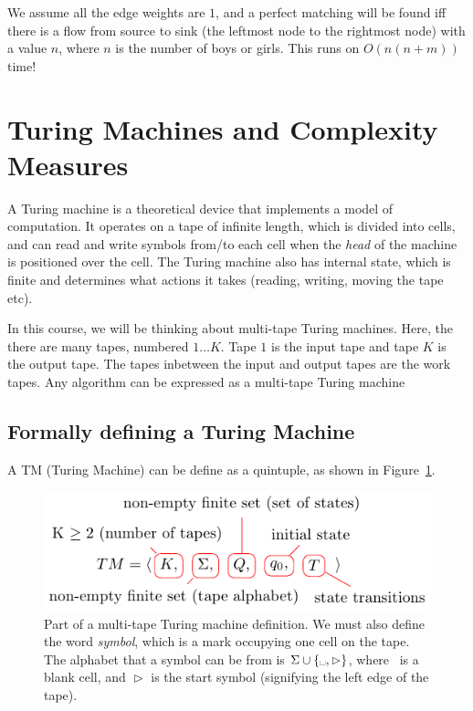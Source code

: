 We assume all the edge weights are $1$, and a perfect matching will be found iff
there is a flow from source to sink (the leftmost node to the rightmost node)
with a value $n$, where $n$ is the number of boys or girls. This runs on
$O(n(n+m))$ time!

\section{Turing Machines and Complexity Measures}

A Turing machine is a theoretical device that implements a model of computation.
It operates on a tape of infinite length, which is divided into cells, and can
read and write symbols from/to each cell when the \textit{head} of the machine
is positioned over the cell. The Turing machine also has internal state, which
is finite and determines what actions it takes (reading, writing, moving the
tape etc).

In this course, we will be thinking about multi-tape Turing machines. Here, the
there are many tapes, numbered $1 \dots K$. Tape $1$ is the input tape and tape
$K$ is the output tape. The tapes inbetween the input and output tapes are the
work tapes. Any algorithm can be expressed as a multi-tape Turing machine

\subsection{Formally defining a Turing Machine}

A TM (Turing Machine) can be define as a quintuple, as shown in
Figure~\ref{fig:tm-definition}.

\begin{figure}[H]
  \centering
  \includegraphics{equations/tm-definition}
  \caption{Part of a multi-tape Turing machine definition. We must also define
  the word \textit{symbol}, which is a mark occupying one cell on the tape. The
  alphabet that a symbol can be from is $\Sigma \cup \{
  \textrm{\textvisiblespace}, \vartriangleright\}$, where \textvisiblespace~is a
  blank cell, and $\vartriangleright$ is the start symbol (signifying the left
  edge of the tape).}
  \label{fig:tm-definition}
\end{figure}

